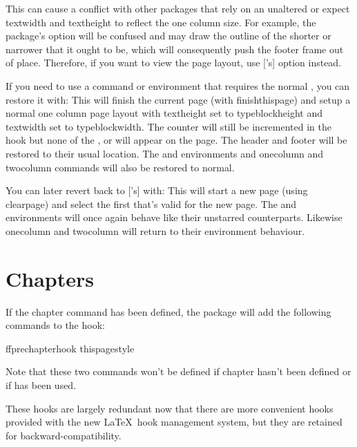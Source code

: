 \documentclass[fontsize=12pt]{scrbook}
\begin{document}
This can cause a conflict with other packages that rely on an unaltered 
 or expect \gls{textwidth} and \gls{textheight} to
reflect the one column size. For example, the 
package's  option will be confused and may draw
the outline of the  shorter or narrower that it ought
to be, which will consequently push the footer frame out of place.
Therefore, if you want to view the page layout, use
['s]  option instead.

If you need to use a command or environment that requires the normal
, you can restore it with:
This will finish the current page (with \gls{finishthispage}) and
setup a normal one column page layout with \gls{textheight} set
to \gls{typeblockheight} and \gls{textwidth} set to
\gls{typeblockwidth}. The  counter will still be
incremented in the  hook but none of the
,  or 
will appear on the page. The header and footer will be restored to
their usual location. The  and 
environments and \gls{onecolumn} and \gls{twocolumn} commands 
will also be restored to normal.

You can later revert back to ['s]  with:
This will start a new page (using \gls{clearpage}) and select the
first  that's valid for the new page. The
 and  environments will once again behave like
their unstarred counterparts. Likewise \gls{onecolumn} and
\gls{twocolumn} will return to their  environment
behaviour.

\section{Chapters}\label{sec:chapters}

If the \gls{chapter} command has been defined, the 
package will add the following commands to the
 hook:
\begin{compactcodebox}
\gls{ffprechapterhook}
\gls{thispagestyle}
\end{compactcodebox}
Note that these two  commands won't be defined if \gls{chapter} hasn't
been defined or if  has been used.

These hooks are largely redundant now that there are more convenient hooks
provided with the new \LaTeX\ hook management system, but they are 
retained for backward-compatibility.
\end{document}
